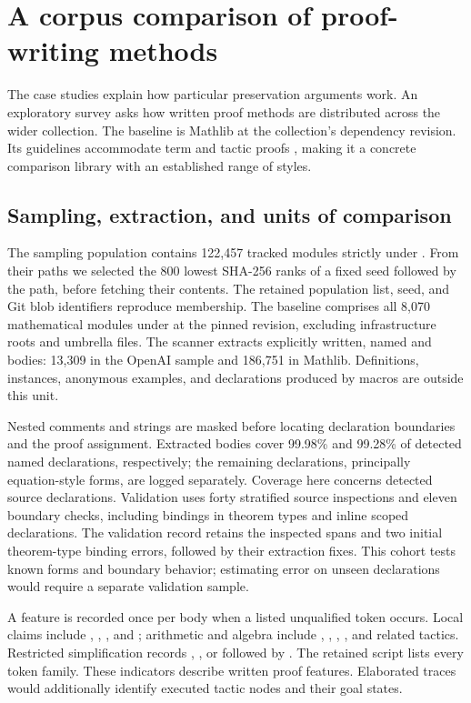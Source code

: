 \section{A corpus comparison of proof-writing methods}
\label{sec:profile}

The case studies explain how particular preservation arguments work.
An exploratory survey asks how written proof methods are distributed
across the wider collection. The baseline is Mathlib at the collection's
dependency revision. Its guidelines accommodate term and tactic proofs
\citep{MathlibStyle}, making it a concrete comparison library with an
established range of styles.

\subsection{Sampling, extraction, and units of comparison}

The sampling population contains 122,457 tracked modules strictly under
. From their paths we selected the 800 lowest SHA-256 ranks
of a fixed seed followed by the path, before fetching their contents.
The retained population list, seed, and Git blob identifiers reproduce
membership. The baseline comprises all 8,070 mathematical modules under
 at the pinned revision, excluding infrastructure roots and
umbrella files. The scanner extracts explicitly written, named
 and  bodies: 13,309 in the OpenAI sample and
186,751 in Mathlib. Definitions, instances, anonymous examples, and
declarations produced by macros are outside this unit.

Nested comments and strings are masked before locating declaration
boundaries and the proof assignment. Extracted bodies cover 99.98\%
and 99.28\% of detected named declarations, respectively; the remaining
declarations, principally equation-style forms, are logged separately.
Coverage here concerns detected source declarations. Validation uses
forty stratified source inspections and eleven boundary checks, including
 bindings in theorem types and inline scoped declarations.
The validation record retains the inspected spans and two initial
theorem-type binding errors, followed by their extraction fixes.
This cohort tests known forms and boundary behavior; estimating error on
unseen declarations would require a separate validation sample.

A feature is recorded once per body when a listed unqualified token
occurs. Local claims include , , , and
; arithmetic and algebra include , ,
, , and related tactics. Restricted simplification
records , , or  followed by .
The retained script lists every token family. These indicators describe
written proof features. Elaborated traces would additionally identify
executed tactic nodes and their goal states.

